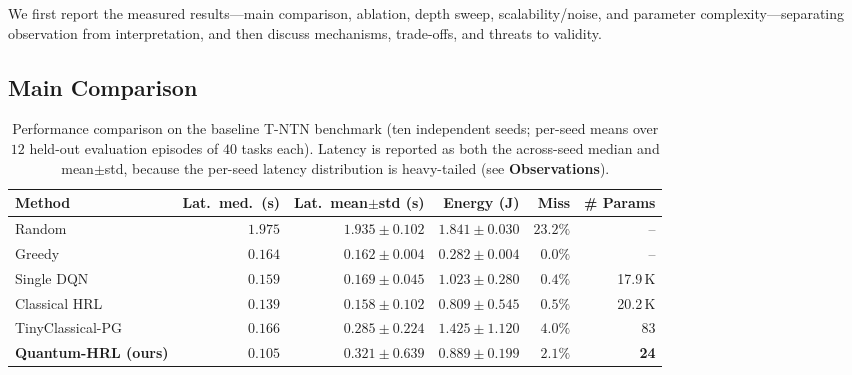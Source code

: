 \documentclass[11pt,a4paper]{article}
\theoremstyle{definition}
\begin{document}
We first report the measured results---main comparison, ablation, depth sweep, scalability/noise, and parameter complexity---separating observation from interpretation, and then discuss mechanisms, trade-offs, and threats to validity.

\subsection{Main Comparison}
\label{subsec:main}

\begin{table}[t]
\centering
\caption{Performance comparison on the baseline T-NTN benchmark (ten independent seeds; per-seed means over $12$ held-out evaluation episodes of $40$ tasks each). Latency is reported as both the across-seed median and mean$\pm$std, because the per-seed latency distribution is heavy-tailed (see \textbf{Observations}).}
\label{tab:results}
\begin{tabular}{@{}lrrrrr@{}}
\toprule
\textbf{Method} & \textbf{Lat.\ med.\ (s)} & \textbf{Lat.\ mean$\pm$std (s)} & \textbf{Energy (J)} & \textbf{Miss} & \textbf{\# Params} \\
\midrule
Random          & $1.975$ & $1.935 \pm 0.102$ & $1.841 \pm 0.030$ & $23.2\%$ & --    \\
Greedy          & $0.164$ & $0.162 \pm 0.004$ & $\mathbf{0.282 \pm 0.004}$ & $0.0\%$ & --    \\
Single DQN      & $0.159$ & $0.169 \pm 0.045$ & $1.023 \pm 0.280$ & $0.4\%$ & 17.9\,K   \\
Classical HRL~\cite{hrl_ntn} & $0.139$ & $0.158 \pm 0.102$ & $0.809 \pm 0.545$ & $0.5\%$ & 20.2\,K  \\
TinyClassical-PG & $0.166$ & $0.285 \pm 0.224$ & $1.425 \pm 1.120$ & $4.0\%$ & 83  \\
\textbf{Quantum-HRL (ours)} & $\mathbf{0.105}$ & $0.321 \pm 0.639$ & $0.889 \pm 0.199$ & $2.1\%$ & \textbf{24}   \\
\bottomrule
\end{tabular}
\end{table}
\end{document}
